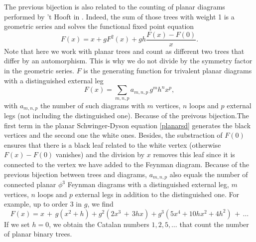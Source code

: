 \documentclass[12pt,here,feynmf]{article}
\begin{document}
The previous bijection is also related to the counting of planar diagrams performed by 't Hooft in \cite{counting}. Indeed, the sum of those trees with weight 1 is a geometric series and solves the functional fixed point equation 
\begin{equation}
F(x)=x+gF^{2}(x)+gh\frac{F(x)-F(0)}{x}.\label{planarsd}
\end{equation}
Note that here  we work with planar trees and count as different two trees that differ by an automorphism. This is why we do not divide by the symmetry factor in the geometric series. 
$F$ is the generating function for trivalent planar diagrams with a distinguished external leg
\begin{equation}
F(x)=\sum_{m,n,p}a_{m,n,p}\,g^{m}h^{n}x^{p},
\end{equation}
with $a_{m,n,p}$ the number of such diagrams with $m$ vertices, $n$ loops and $p$ external legs (not including the distinguished one). Because of the preivous bijection.The first term in the planar Schwinger-Dyson equation \eqref{planarsd} generates the black vertices and the second one the white ones. Besides, the substraction of $F(0)$ ensures that there is a  black leaf related to the white vertex (otherwise $F(x)-F(0)$ vanishes) and the division by $x$ removes this leaf since it is connected to the vertex we have added to the Feynman diagram.  Because of the previous bijection between trees and diagrams, $a_{m,n,p}$ also equals the number of connected planar $\phi^{3}$ Feynman diagrams with a distinguished external leg, $m$ vertices, $n$ loops and $p$ external legs in addition to the distinguished one. For example, up to order 3 in $g$, we find
\begin{equation}
F(x)=x\,+\,g(x^{2}+h)+g^{2}(2x^{3}\,+\,3hx)+g^{3}(5x^{4}+10hx^{2}+4h^{2})\,+\,\dots
\end{equation}
If we set $h=0$, we obtain the Catalan numbers $1,2,5,\dots$ that count the number of planar binary trees. 






\end{document}
